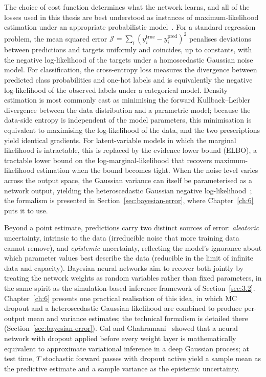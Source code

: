The choice of cost function determines what the network learns, and all of the losses used in this thesis are best understood as instances of maximum-likelihood estimation under an appropriate probabilistic model~\cite{bishop,Murphy:2022pml}.
For a standard regression problem, the mean squared error $\mathcal{J} = \sum_i (y_i^\mathrm{true} - y_i^\mathrm{pred})^2$ penalises deviations between predictions and targets uniformly and coincides, up to constants, with the negative log-likelihood of the targets under a homoscedastic Gaussian noise model.
For classification, the cross-entropy loss measures the divergence between predicted class probabilities and one-hot labels and is equivalently the negative log-likelihood of the observed labels under a categorical model.
Density estimation is most commonly cast as minimising the forward Kullback--Leibler divergence between the data distribution and a parametric model; because the data-side entropy is independent of the model parameters, this minimisation is equivalent to maximising the log-likelihood of the data, and the two prescriptions yield identical gradients.
For latent-variable models in which the marginal likelihood is intractable, this is replaced by the evidence lower bound (ELBO), a tractable lower bound on the log-marginal-likelihood that recovers maximum-likelihood estimation when the bound becomes tight.
When the noise level varies across the output space, the Gaussian variance can itself be parameterised as a network output, yielding the heteroscedastic Gaussian negative log-likelihood~\cite{heteroscedastic-error}; the formalism is presented in Section~\ref{sec:bayesian-error}, where Chapter~\ref{ch:6} puts it to use.

Beyond a point estimate, predictions carry two distinct sources of error: \textit{aleatoric} uncertainty, intrinsic to the data (irreducible noise that more training data cannot remove), and \textit{epistemic} uncertainty, reflecting the model's ignorance about which parameter values best describe the data (reducible in the limit of infinite data and capacity).
Bayesian neural networks aim to recover both jointly by treating the network weights as random variables rather than fixed parameters, in the same spirit as the simulation-based inference framework of Section~\ref{sec:3.2}.
Chapter~\ref{ch:6} presents one practical realisation of this idea, in which MC dropout and a heteroscedastic Gaussian likelihood are combined to produce per-output mean and variance estimates; the technical formalism is detailed there (Section~\ref{sec:bayesian-error}).
Gal and Ghahramani~\cite{mcdropout} showed that a neural network with dropout applied before every weight layer is mathematically equivalent to approximate variational inference in a deep Gaussian process; at test time, $T$ stochastic forward passes with dropout active yield a sample mean as the predictive estimate and a sample variance as the epistemic uncertainty.

